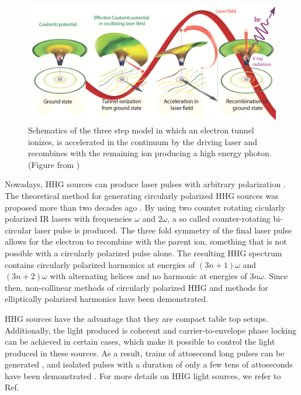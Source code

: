 \begin{figure}[!ht]
\centering
\includegraphics[width=0.8\columnwidth]{figs/Intro/HHG.png}
\caption{\label{fig:hhg_3_step} Schematics of the three step model in which an electron tunnel ionizes, is accelerated in the continuum by the driving laser and recombines with the remaining ion producing a high energy photon. (Figure from \cite{popmintchev2010})
}
\end{figure}


Nowadays, HHG sources can produce laser pulses with arbitrary polarization \cite{fleischer2014,pisanty2014,kfir2015,fan2015,hickstein2015}. The theoretical method for generating circularly polarized HHG sources was proposed more than two decades ago \cite{eichmann1995,long1995}. By using two counter rotating cicularly polarized IR lasers with frequencies $\omega$ and $2\omega$, a so called counter-rotating bi-circular laser pulse is produced. The three fold symmetry of the final laser pulse allows for the electron to recombine with the parent ion, something that is not possible with a circularly polarized pulse alone. The resulting HHG spectrum contains circularly polarized harmonics at energies of $(3n+1)\omega$ and  $(3n+2)\omega$ with alternating helices and no harmonic at energies of $3n\omega$. Since then, non-collinear methods of circularly polarized HHG \cite{hickstein2015} and methods for elliptically polarized harmonics \cite{barreau2018} have been demonstrated.

HHG sources have the advantage that they are compact table top setups. Additionally, the light produced is coherent and carrier-to-envelope phase locking can be achieved in certain cases, which make it possible to control the light produced in these sources. As a result, trains of attosecond long pulses can be generated \cite{kim2013}, and isolated pulses with a duration of only a few tens of attoseconds have been demonstrated \cite{zhao2012,chen2014}. For more details on HHG light sources, we refer to Ref.~\cite{popmintchev2010,chini2014}

